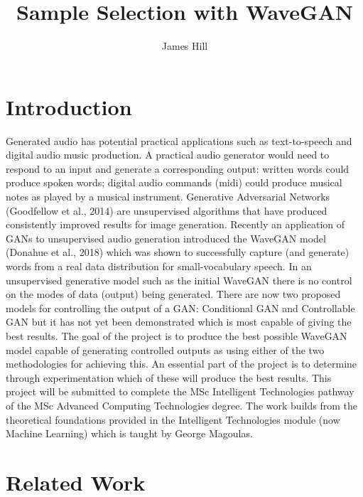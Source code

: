\documentclass{article}
\title{Sample Selection with WaveGAN}
\author{James Hill}
\date{}
\begin{document}
\maketitle

\section{Introduction}

Generated audio has potential practical applications such as text-to-speech and digital audio music production.
A practical audio generator would need to respond to an input and generate a corresponding output: written words could produce spoken words; digital audio commands (midi) could produce musical notes as played by a musical instrument.
\newline
\newline
Generative Adversarial Networks (Goodfellow et al., 2014) are unsupervised algorithms that have produced consistently improved results for image generation.
Recently an application of GANs to unsupervised audio generation introduced the WaveGAN model (Donahue et al., 2018) which was shown to successfully capture (and generate) words from a real data distribution for small-vocabulary speech.
\newline
\newline
In an unsupervised generative model such as the initial WaveGAN there is no control on the modes of data (output) being generated.
There are now two proposed models for controlling the output of a GAN: Conditional GAN and Controllable GAN but it has not yet been demonstrated which is most capable of giving the best results.
\newline
\newline
The goal of the project is to produce the best possible WaveGAN model capable of generating controlled outputs as using either of the two methodologies for achieving this.
An essential part of the project is to determine through experimentation which of these will produce the best results.
\newline
\newline
This project will be submitted to complete the MSc Intelligent Technologies pathway of the MSc Advanced Computing Technologies degree.
The work builds from the theoretical foundations provided in the Intelligent Technologies module (now Machine Learning) which is taught by George Magoulas.

\section{Related Work}
\end{document}
